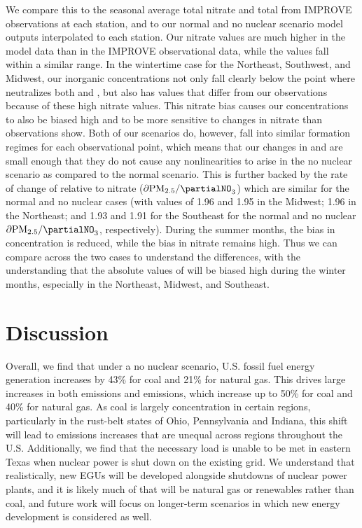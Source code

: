 \documentclass[12]{article}
\begin{document}
We compare this to the seasonal average total nitrate and total  from IMPROVE observations at each station, and to our normal and no nuclear scenario model outputs interpolated to each station. Our nitrate values are much higher in the model data than in the IMPROVE observational data, while the  values fall within a similar range. In the wintertime case for the Northeast, Southwest, and Midwest, our inorganic  concentrations not only fall clearly below the point where  neutralizes both  and , but also has values that differ from our observations because of these high nitrate values. This nitrate bias causes our  concentrations to also be biased high and to be more sensitive to changes in nitrate than observations show. Both of our scenarios do, however, fall into similar  formation regimes for each observational point, which means that our changes in  and  are small enough that they do not cause any nonlinearities to arise in the no nuclear scenario as compared to the normal scenario. This is further backed by the rate of change of  relative to nitrate ($\partial\ce{PM_{2.5}}/\partialNO_3$) which are similar for the normal and no nuclear cases (with values of 1.96 and 1.95 in the Midwest; 1.96 in the Northeast; and 1.93 and 1.91 for the Southeast for the normal and no nuclear $\partial\ce{PM_{2.5}}/\partialNO_3$, respectively). During the summer months, the bias in  concentration is reduced, while the bias in nitrate remains high. Thus we can compare across the two cases to understand the differences, with the understanding that the absolute values of  will be biased high during the winter months, especially in the Northeast, Midwest, and Southeast.


\section{Discussion}

Overall, we find that under a no nuclear scenario, U.S. fossil fuel energy generation increases by 43\% for coal and 21\% for natural gas. This drives large increases in both  emissions and  emissions, which increase up to 50\% for coal and 40\% for natural gas. As coal is largely concentration in certain regions, particularly in the rust-belt states of Ohio, Pennsylvania and Indiana, this shift will lead to emissions increases that are unequal across regions throughout the U.S. Additionally, we find that the necessary load is unable to be met in eastern Texas when nuclear power is shut down on the existing grid. We understand that realistically, new EGUs will be developed alongside shutdowns of nuclear power plants, and it is likely much of that will be natural gas or renewables rather than coal, and future work will focus on longer-term scenarios in which new energy development is considered as well.
\end{document}
